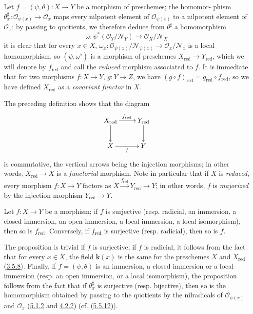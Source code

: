 \begin{env}[5.1.5]
\label{I.5.1.5}
Let $f=(\psi,\theta):X\to Y$ be a morphism of preschemes; the homomor-
phism $\theta_x^\sharp:\mathscr{O}_{\psi(x)}\to\mathscr{O}_x$ maps every
nilpotent element of $\mathscr{O}_{\psi(x)}$ to a nilpotent element of
$\mathscr{O}_x$; by passing to quotients, we therefore deduce from
$\theta^\sharp$ a homomorphism
\[
  \omega:\psi^*(\mathscr{O}_Y/\mathscr{N}_Y)
  \longrightarrow \mathscr{O}_X/\mathscr{N}_X
\]
it is clear that for every $x\in X$,
$\omega_x:\mathscr{O}_{\psi(x)}/\mathscr{N}_{\psi(x)}
\to\mathscr{O}_x/\mathscr{N}_x$ is a local homomorphism, so
$(\psi,\omega^\flat)$ is a morphism of preschemes
$X_{\mathrm{red}}\to Y_{\mathrm{red}}$, which we will denote by
$f_{\mathrm{red}}$ and call the \emph{reduced} morphism associated to $f$. It
is immediate that for two morphisms $f:X\to Y$, $g:Y\to Z$, we have
$(g\circ f)_{\mathrm{red}}=g_{\mathrm{red}}\circ f_{\mathrm{red}}$, so we have
defined $X_{\mathrm{red}}$ as a \emph{covariant functor} in $X$.

The preceding definition shows that the diagram
\[
  \xymatrix{
    X_{\mathrm{red}}\ar[r]^{f_{\mathrm{red}}}\ar[d] &
    Y_{\mathrm{red}}\ar[d]\\
    X\ar[r]_f & Y
  }
\]
is commutative, the vertical arrows being the injection morphisms; in
other words, $X_{\mathrm{red}}\to X$ is a \emph{functorial} morphism.
Note in particular that if $X$ is \emph{reduced}, every morphism
$f:X\to Y$ factors as
$X\xrightarrow{f_{\mathrm{red}}}Y_{\mathrm{red}}\to Y$; in other words,
$f$ is \emph{majorized} by the injection morphism
$Y_{\mathrm{red}}\to Y$.
\end{env}

\begin{proposition}[5.1.6]
\label{I.5.1.6}
Let $f:X\to Y$ be a morphism; if $f$ is surjective (\textup{resp.} radicial, an
immersion, a closed immersion, an open immersion, a local immersion,
a local isomorphism), then so is $f_{\mathrm{red}}$. Conversely,
if $f_{\mathrm{red}}$ is surjective (\textup{resp.} radicial), then so is
$f$.
\end{proposition}

The proposition is trivial if $f$ is surjective; if $f$ is radicial, it
follows from the fact that for every $x\in X$, the field $\boldsymbol{k}(x)$ is the same
for the preschemes $X$ and $X_{\mathrm{red}}$
(\hyperref[I.3.5.8]{3.5.8}). Finally, if $f=(\psi,\theta)$ is an
immersion, a closed immersion or a local immersion (resp. an open immersion,
or a local isomorphism), the proposition follows from the fact that if
$\theta_x^\sharp$ is surjective (resp. bijective), then so is the
homomorphism obtained by passing to the quotients by the nilradicals of
$\mathscr{O}_{\psi(x)}$ and $\mathscr{O}_x$
(\hyperref[I.5.1.2]{5.1.2} and \hyperref[I.4.2.2]{4.2.2})
(cf. (\hyperref[I.5.5.12]{5.5.12})).

